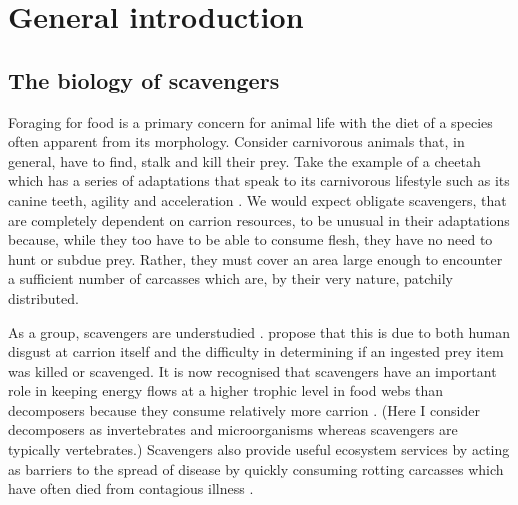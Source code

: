 \chapter{General introduction}
\label{chap:intro}
\section{\uppercase{T}he biology of scavengers}
Foraging for food is a primary concern for animal life \citep{danchin2008behavioural} with the diet of a species often apparent from its morphology. Consider carnivorous animals that, in general, have to find, stalk and kill their prey. Take the example of a cheetah which has a series of adaptations that speak to its carnivorous lifestyle such as its canine teeth, agility and acceleration \citep{bissett2007habitat}. We would expect obligate scavengers, that are completely dependent on carrion resources, to be unusual in their adaptations because, while they too have to be able to consume flesh, they have no need to hunt or subdue prey. Rather, they must cover an area large enough to encounter a sufficient number of carcasses which are, by their very nature, patchily distributed. 

As a group, scavengers are understudied \citep{sekercioglu2006increasing,selva2007nested,wilson2011scavenging}. \cite{devault2003scavenging} propose that this is due to both human disgust at carrion itself and the difficulty in determining if an ingested prey item was killed or scavenged. It is now recognised that scavengers have an important role in keeping energy flows at a higher trophic level in food webs than decomposers because they consume relatively more carrion \citep{devault2003scavenging}. (Here I consider decomposers as invertebrates and microorganisms whereas scavengers are typically vertebrates.) %
Scavengers also provide useful ecosystem services by acting as barriers to the spread of disease by quickly consuming rotting carcasses which have often died from contagious illness \citep{ogada2012effects,devault2003scavenging}. 


